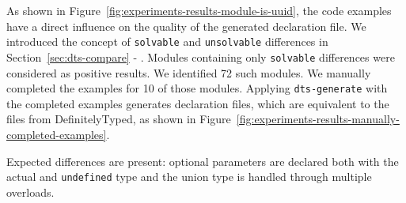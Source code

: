 \documentclass[english,cleveref,autoref,submission]{programming}
\newenvironment{changethis}{%
  \begin{tcolorbox}[breakable,notitle,boxrule=0pt,colback=blue!20,colframe=blue!20]}{%
  \end{tcolorbox}}
\newcommand{\secref}[1]{Section~\ref{#1} - \nameref{#1}}
\newcommand{\figref}[1]{Figure~\ref{#1}}
\begin{document}
As shown in \figref{fig:experiments-results-module-is-uuid}, the code examples have a
direct influence on the quality of the generated declaration file. We introduced the
concept of \texttt{solvable} and \texttt{unsolvable} differences in
\secref{sec:dts-compare}. Modules containing only \texttt{solvable} differences were
considered as positive results. We identified 72 such modules. We manually completed the
examples for 10 of those modules. Applying \texttt{dts-generate} with the completed
examples generates declaration files, which are equivalent to the files from DefinitelyTyped, as
shown in \figref{fig:experiments-results-manually-completed-examples}.
\begin{changethis}
  Expected differences are present: optional parameters are declared both with the actual
  and \texttt{undefined} type and the union type is handled through multiple overloads.
\end{changethis}
\end{document}
